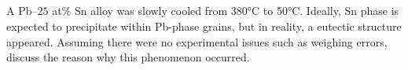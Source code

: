 \newpage
\subsection{}
A Pb–$25$ at$\%$ Sn alloy was slowly cooled from 380°C to 50°C. Ideally, Sn phase is expected to precipitate within Pb-phase grains, but in reality, a eutectic structure appeared. Assuming there were no experimental issues such as weighing errors, discuss the reason why this phenomenon occurred.


